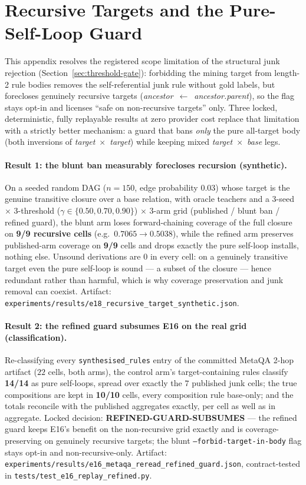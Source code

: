 \section{Recursive Targets and the Pure-Self-Loop Guard}
\label{sec:recursive-boundary}

This appendix resolves the registered scope limitation of the structural
junk rejection (Section~\ref{sec:threshold-gate}): forbidding the mining
target from length-2 rule bodies removes the self-referential junk rule
without gold labels, but forecloses genuinely recursive targets
(\emph{ancestor}~$\leftarrow$~\emph{ancestor.parent}), so the flag stays
opt-in and licenses ``safe on non-recursive targets'' only. Three locked,
deterministic, fully replayable results at zero provider cost replace that
limitation with a strictly better mechanism: a guard that bans \emph{only}
the pure all-target body (both inversions of
\emph{target}~$\times$~\emph{target}) while keeping mixed
\emph{target}~$\times$~\emph{base} legs.

\paragraph{Result 1: the blunt ban measurably forecloses recursion (synthetic).}
On a seeded random DAG ($n{=}150$, edge probability $0.03$) whose target is
the genuine transitive closure over a base relation, with oracle teachers
and a $3$-seed $\times$ $3$-threshold ($\gamma \in \{0.50, 0.70, 0.90\}$)
$\times$ $3$-arm grid (published / blunt ban / refined guard), the blunt
arm loses forward-chaining coverage of the full closure on \textbf{9/9
recursive cells} (e.g.\ $0.7065 \rightarrow 0.5038$), while the refined arm
preserves published-arm coverage on \textbf{9/9} cells and drops exactly
the pure self-loop installs, nothing else. Unsound derivations are $0$ in
every cell: on a genuinely transitive target even the pure self-loop is
sound --- a subset of the closure --- hence redundant rather than harmful,
which is why coverage preservation and junk removal can coexist. Artifact:
\texttt{experiments/results/e18\_recursive\_target\_synthetic.json}.

\paragraph{Result 2: the refined guard subsumes E16 on the real grid (classification).}
Re-classifying every \texttt{synthesised\_rules} entry of the committed
MetaQA 2-hop artifact ($22$ cells, both arms), the control arm's
target-containing rules classify \textbf{14/14} as pure self-loops, spread
over exactly the $7$ published junk cells; the true compositions are kept
in \textbf{10/10} cells, every composition rule base-only; and the totals
reconcile with the published aggregates exactly, per cell as well as in
aggregate. Locked decision: \textbf{REFINED-GUARD-SUBSUMES} --- the
refined guard keeps E16's benefit on the non-recursive grid exactly and is
coverage-preserving on genuinely recursive targets; the blunt
\texttt{--forbid-target-in-body} flag stays opt-in and non-recursive-only.
Artifact: \texttt{experiments/results/e16\_metaqa\_reread\_refined\_guard.json},
contract-tested in \texttt{tests/test\_e16\_replay\_refined.py}.

